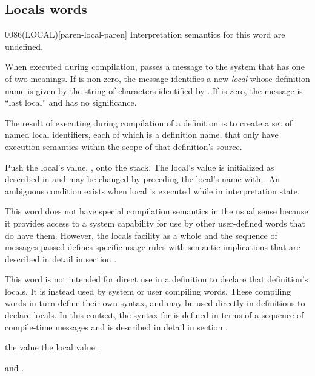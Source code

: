 \subsection{Locals words} %

\begin{worddef}[LOCAL]{0086}{(LOCAL)}[paren-local-paren]
\interpret
	Interpretation semantics for this word are undefined.

\execute

	When executed during compilation,  passes a
	message to the system that has one of two meanings. If 
	is non-zero, the message identifies a new \emph{local} whose
	definition name is given by the string of characters identified
	by . If  is zero, the message is ``last
	local'' and  has no significance.

	The result of executing  during compilation of a
	definition is to create a set of named local identifiers, each
	of which is a definition name, that only have execution
	semantics within the scope of that definition's source.

\execute[local]

	Push the local's value, , onto the stack. The local's
	value is initialized as described in  and may be changed by preceding the local's
	name with . An ambiguous condition exists when local is
	executed while in interpretation state.

\note
	This word does not have special compilation semantics in the
	usual sense because it provides access to a system capability
	for use by other user-defined words that do have them. However,
	the locals facility as a whole and the sequence of messages
	passed defines specific usage rules with semantic implications
	that are described in detail in section
	.

\note
	This word is not intended for direct use in a definition to
	declare that definition's locals. It is instead used by system
	or user compiling words. These compiling words in turn define
	their own syntax, and may be used directly in definitions to
	declare locals. In this context, the syntax for 
	is defined in terms of a sequence of compile-time messages and
	is described in detail in section .


	 the value  
	the local value
	.

\see {} and
	.
\end{worddef}


